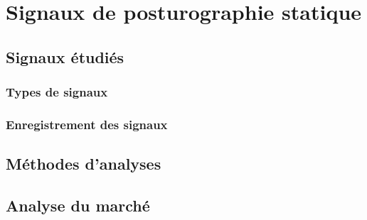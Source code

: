 \chapter{Signaux de posturographie statique}

\section{Signaux étudiés}

\subsection{Types de signaux}
\subsection{Enregistrement des signaux}

\section{Méthodes d'analyses}

\section{Analyse du marché}